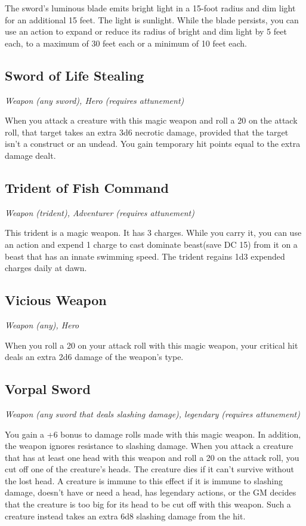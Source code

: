 The sword's luminous blade emits bright light in a 15-foot radius and dim light for an additional 15 feet. The light is sunlight. While the blade persists, you can use an action to expand or reduce its radius of bright and dim light by 5 feet each, to a maximum of 30 feet each or a minimum of 10 feet each.

\subsection{Sword of Life Stealing}
\textit{Weapon (any sword), Hero (requires attunement)}

When you attack a creature with this magic weapon and roll a 20 on the attack roll, that target takes an extra 3d6 necrotic damage, provided that the target isn't a construct or an undead. You gain temporary hit points equal to the extra damage dealt.

\subsection{Trident of Fish Command}
\textit{Weapon (trident), Adventurer (requires attunement)}

This trident is a magic weapon. It has 3 charges. While you carry it, you can use an action and expend 1 charge to cast
dominate beast(save DC 15) from it on a beast that has an innate swimming speed. The trident regains 1d3 expended charges daily at dawn.

\subsection{Vicious Weapon}
\textit{Weapon (any), Hero}

When you roll a 20 on your attack roll with this magic weapon, your critical hit deals an extra 2d6 damage of the weapon's type.

\subsection{Vorpal Sword}
\textit{Weapon (any sword that deals slashing damage), legendary (requires attunement)}

You gain a +6 bonus to damage rolls made with this magic weapon. In addition, the weapon ignores resistance to slashing damage.  When you attack a creature that has at least one head with this weapon and roll a 20 on the attack roll, you cut off one of the creature's heads. The creature dies if it can't survive without the lost head. A creature is immune to this effect if it is immune to slashing damage, doesn't have or need a head, has legendary actions, or the GM decides that the creature is too big for its head to be cut off with this weapon. Such a creature instead takes an extra 6d8 slashing damage from the hit.


